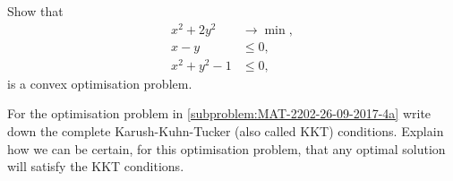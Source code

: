 \Problem

\begin{subproblem}
    \label{subproblem:MAT-2202-26-09-2017-4a}
    Show that
    \begin{align*}
        x^2 + 2y^2 & \to \min,\\
        x - y & \leq 0, \\
        x^2 + y^2 - 1 & \leq 0,
    \end{align*}
    is a convex optimisation problem.
\end{subproblem}

\begin{subproblem}
    For the optimisation problem in \cref{subproblem:MAT-2202-26-09-2017-4a} write down the
complete Karush-Kuhn-Tucker (also called KKT) conditions. Explain how we can be certain, for this optimisation
problem, that any optimal solution will satisfy the KKT
conditions.
\end{subproblem}